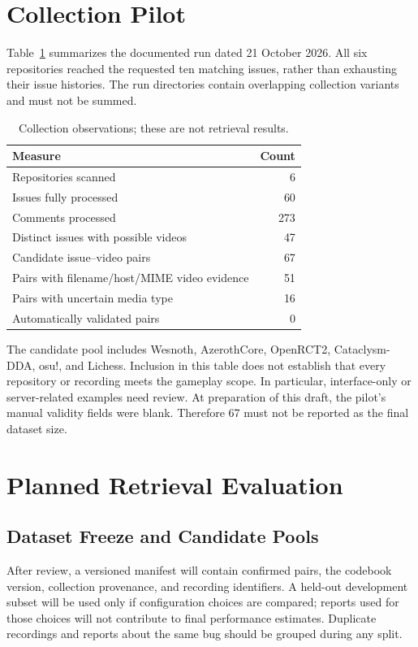 \documentclass[journal,a4paper,onecolumn]{IEEEtran}
\begin{document}
\section{Collection Pilot}
Table~\ref{tab:pilot} summarizes the documented run dated 21 October 2026. All six repositories reached the requested ten matching issues, rather than exhausting their issue histories. The run directories contain overlapping collection variants and must not be summed.
\begin{table}[ht]
\centering
\caption{Collection observations; these are not retrieval results.}
\label{tab:pilot}
\begin{tabular}{lr}
\toprule Measure & Count\\\midrule
Repositories scanned & 6\\
Issues fully processed & 60\\
Comments processed & 273\\
Distinct issues with possible videos & 47\\
Candidate issue--video pairs & 67\\
Pairs with filename/host/MIME video evidence & 51\\
Pairs with uncertain media type & 16\\
Automatically validated pairs & 0\\
\bottomrule
\end{tabular}
\end{table}
The candidate pool includes Wesnoth, AzerothCore, OpenRCT2, Cataclysm-DDA, osu!, and Lichess. Inclusion in this table does not establish that every repository or recording meets the gameplay scope. In particular, interface-only or server-related examples need review. At preparation of this draft, the pilot's manual validity fields were blank. Therefore 67 must not be reported as the final dataset size.

\section{Planned Retrieval Evaluation}
\subsection{Dataset Freeze and Candidate Pools}
After review, a versioned manifest will contain confirmed pairs, the codebook version, collection provenance, and recording identifiers. A held-out development subset will be used only if configuration choices are compared; reports used for those choices will not contribute to final performance estimates. Duplicate recordings and reports about the same bug should be grouped during any split.
\end{document}
